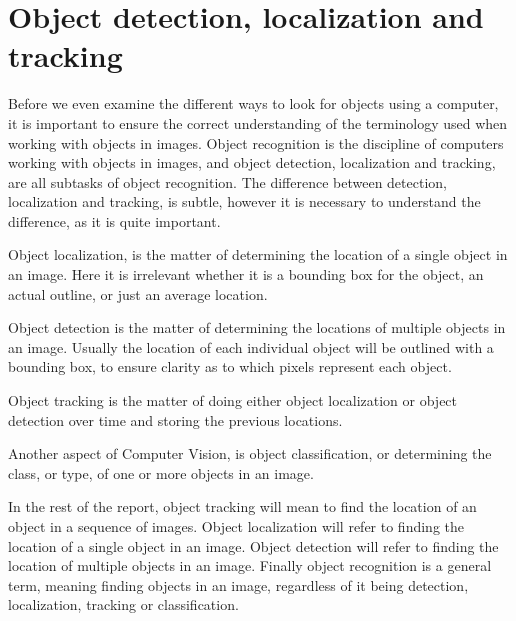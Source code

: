 \section{Object detection, localization and tracking}
Before we even examine the different ways to look for objects using a computer, it is important to ensure the correct understanding of the terminology used when working with objects in images.
Object recognition is the discipline of computers working with objects in images, and object detection, localization and tracking, are all subtasks of object recognition.
The difference between detection, localization and tracking, is subtle, however it is necessary to understand the difference, as it is quite important\cite{objecttrackdetect}.

Object localization, is the matter of determining the location of a single object in an image. 
Here it is irrelevant whether it is a bounding box for the object, an actual outline, or just an average location.

Object detection is the matter of determining the locations of multiple objects in an image.
Usually the location of each individual object will be outlined with a bounding box, to ensure clarity as to which pixels represent each object.

Object tracking is the matter of doing either object localization or object detection over time and storing the previous locations.

Another aspect of Computer Vision, is object classification, or determining the class, or type, of one or more objects in an image.

In the rest of the report, object tracking will mean to find the location of an object in a sequence of images.
Object localization will refer to finding the location of a single object in an image.
Object detection will refer to finding the location of multiple objects in an image.
Finally object recognition is a general term, meaning finding objects in an image, regardless of it being detection, localization, tracking or classification. 
